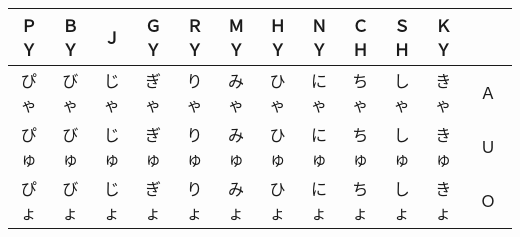 \begin{center}
\begin{tabular}{|cccc|ccccccc|c|}
\hline
ＰＹ & ＢＹ & Ｊ\footnotemark   & ＧＹ & ＲＹ & ＭＹ & ＨＹ & ＮＹ & ＣＨ & ＳＨ & ＫＹ & 　　 \\\hline
ぴゃ & びゃ & じゃ              & ぎゃ & りゃ & みゃ & ひゃ & にゃ & ちゃ & しゃ & きゃ & Ａ \\
ぴゅ & びゅ & じゅ              & ぎゅ & りゅ & みゅ & ひゅ & にゅ & ちゅ & しゅ & きゅ & Ｕ \\
ぴょ & びょ & じょ              & ぎょ & りょ & みょ & ひょ & にょ & ちょ & しょ & きょ & Ｏ \\
\hline
\end{tabular}
\end{center}

